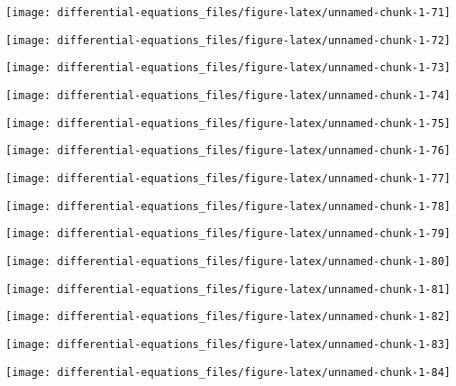 \documentclass[]{tufte-handout}
\begin{document}
\begin{marginfigure}
\texttt{[image: differential-equations\_files/figure-latex/unnamed-chunk-1-71]} \end{marginfigure}
\begin{marginfigure}
\texttt{[image: differential-equations\_files/figure-latex/unnamed-chunk-1-72]} \end{marginfigure}
\begin{marginfigure}
\texttt{[image: differential-equations\_files/figure-latex/unnamed-chunk-1-73]} \end{marginfigure}
\begin{marginfigure}
\texttt{[image: differential-equations\_files/figure-latex/unnamed-chunk-1-74]} \end{marginfigure}
\begin{marginfigure}
\texttt{[image: differential-equations\_files/figure-latex/unnamed-chunk-1-75]} \end{marginfigure}
\begin{marginfigure}
\texttt{[image: differential-equations\_files/figure-latex/unnamed-chunk-1-76]} \end{marginfigure}
\begin{marginfigure}
\texttt{[image: differential-equations\_files/figure-latex/unnamed-chunk-1-77]} \end{marginfigure}
\begin{marginfigure}
\texttt{[image: differential-equations\_files/figure-latex/unnamed-chunk-1-78]} \end{marginfigure}
\begin{marginfigure}
\texttt{[image: differential-equations\_files/figure-latex/unnamed-chunk-1-79]} \end{marginfigure}
\begin{marginfigure}
\texttt{[image: differential-equations\_files/figure-latex/unnamed-chunk-1-80]} \end{marginfigure}
\begin{marginfigure}
\texttt{[image: differential-equations\_files/figure-latex/unnamed-chunk-1-81]} \end{marginfigure}
\begin{marginfigure}
\texttt{[image: differential-equations\_files/figure-latex/unnamed-chunk-1-82]} \end{marginfigure}
\begin{marginfigure}
\texttt{[image: differential-equations\_files/figure-latex/unnamed-chunk-1-83]} \end{marginfigure}
\begin{marginfigure}
\texttt{[image: differential-equations\_files/figure-latex/unnamed-chunk-1-84]} \end{marginfigure}
\end{document}
